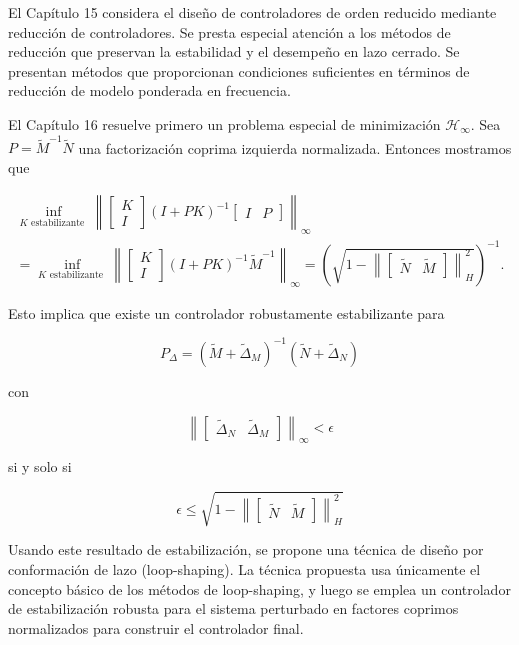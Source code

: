 El Capítulo 15 considera el diseño de controladores de orden reducido mediante reducción de controladores. Se presta especial atención a los métodos de reducción que preservan la estabilidad y el desempeño en lazo cerrado. Se presentan métodos que proporcionan condiciones suficientes en términos de reducción de modelo ponderada en frecuencia.

El Capítulo 16 resuelve primero un problema especial de minimización $\mathcal{H}_{\infty}$. Sea $P=\tilde{M}^{-1} \tilde{N}$ una factorización coprima izquierda normalizada. Entonces mostramos que

$$
\begin{aligned}
\inf _{K \text { estabilizante }}\left\|\left[\begin{array}{c}
K \\
I
\end{array}\right](I+P K)^{-1}\left[\begin{array}{ll}
I & P
\end{array}\right]\right\|_{\infty} \\
=\inf _{K \text { estabilizante }}\left\|\left[\begin{array}{c}
K \\
I
\end{array}\right](I+P K)^{-1} \tilde{M}^{-1}\right\|_{\infty}=\left(\sqrt{1-\left\|\left[\begin{array}{ll}
\tilde{N} & \tilde{M}
\end{array}\right]\right\|_{H}^{2}}\right)^{-1} .
\end{aligned}
$$

Esto implica que existe un controlador robustamente estabilizante para

$$
P_{\Delta}=\left(\tilde{M}+\tilde{\Delta}_{M}\right)^{-1}\left(\tilde{N}+\tilde{\Delta}_{N}\right)
$$

con

$$
\left\|\left[\begin{array}{ll}
\tilde{\Delta}_{N} & \tilde{\Delta}_{M}
\end{array}\right]\right\|_{\infty}<\epsilon
$$

si y solo si

$$
\epsilon \leq \sqrt{1-\left\|\left[\begin{array}{ll}
\tilde{N} & \tilde{M}
\end{array}\right]\right\|_{H}^{2}}
$$

Usando este resultado de estabilización, se propone una técnica de diseño por conformación de lazo (loop-shaping). La técnica propuesta usa únicamente el concepto básico de los métodos de loop-shaping, y luego se emplea un controlador de estabilización robusta para el sistema perturbado en factores coprimos normalizados para construir el controlador final.

